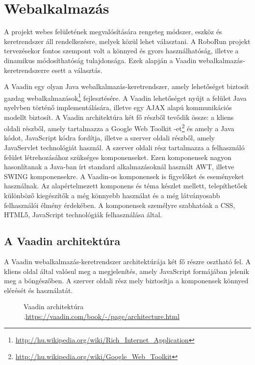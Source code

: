 \section{Webalkalmazás}\label{sec:Vaadin}

	A projekt webes felületének megvalósítására rengeteg módszer, eszköz és keretrendszer áll rendelkezésre, melyek közül lehet választani. A RoboRun projekt tervezésekor fontos szempont volt a könnyed és gyors használhatóság, illetve a dinamikus módosíthatóság tulajdonsága. Ezek alapján a Vaadin\cite{vaadin} webalkalmazás-keretrendszerre esett a választás.
	
	A Vaadin egy olyan Java webalkalmazás-keretrendszer, amely lehetőséget biztosít gazdag webalkalmazások\footnote{\href {http://hu.wikipedia.org/wiki/Rich\_Internet\_Application}{http://hu.wikipedia.org/wiki/Rich\_Internet\_Application}} fejlesztésére. A Vaadin lehetőséget nyújt a felület Java nyelvben történő implementálására, illetve egy AJAX alapú kommunikációs modellt biztosít. A Vaadin architektúra két fő részből tevődik össze: a kliens oldali részből, amely tartalmazza a Google Web Toolkit -et\footnote{\href {http://hu.wikipedia.org/wiki/Google\_Web\_Toolkit}{http://hu.wikipedia.org/wiki/Google\_Web\_Toolkit}} és amely a Java kódot, JavaScript kódra fordítja, illetve a szerver oldali részből, amely JavaServlet technológiát használ.
A szerver oldali rész tartalmazza a felhasználó felület létrehozásához szükséges komponenseket. Ezen komponensek nagyon hasonlítanak a Java-ban írt standard alkalmazásoknál használt AWT, illetve SWING komponensekre. A Vaadin-os komponensek is figyelőket és eseményeket használnak. Az alapértelmezett komponens és téma készlet mellett, telepíthetőek különböző kiegészítők a még könnyebb használat és a még látványosabb felhasználói élmény érdekében. A komponensek személyre szabhatóak a CSS, HTML5, JavaScript technológiák felhasználása által.

\subsection{A Vaadin architektúra}\label{sec:Vaadin architektura}

A Vaadin webalkalmazás-keretrendszer architektúrája két fő részre osztható fel. A kliens oldal által valósul meg a megjelenítés, amely JavaScript formájában jelenik meg a böngészőben. A szerver oldali rész  mely biztosítja a komponensek könnyed elérését és használatát.
\begin{figure}[h!]
  \centering
  \caption[Vaadin keretrendszer architektúrája]%
  {Vaadin architektúra\\
  {\white .}\hfill\url{https://vaadin.com/book/-/page/architecture.html}}
  \label{fig:vaadinArchitektura}
\end{figure} 

